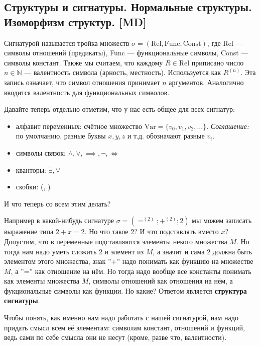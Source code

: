 \documentclass[a4paper, fleqn]{article}
\begin{document}
    \subsection{Структуры и сигнатуры. Нормальные структуры. Изоморфизм структур. [MD]}
    \begin{definition}
        Сигнатурой называется тройка множеств $\sigma = (\text{Rel}, \text{Func}, \text{Const})$,
        где Rel --- символы отношений (предикаты), Func --- функциональные символы,
        Const --- символы констант. Также мы считаем, что каждому $R \in \text{Rel}$
        приписано число $n \in \mathbb{N}$ --- валентность символа (арность, местность).
        Используется как $R^{(n)}$. Эта запись означает, что символ отношения
        принимает $n$ аргументов. Аналогично вводится валентность для функциональных символов.
    \end{definition}

    Давайте теперь отдельно отметим, что у нас есть общее для всех сигнатур:
    \begin{itemize}
        \item алфавит переменных: счётное множество $\text{Var} = \{v_0, v_1, v_2, \dots\}$.
        \textit{Соглашение:} по умолчанию, разные буквы $x, y, z$ и т.д. 
        обозначают разные $v_i$.
        \item символы связок: $\land, \lor, \implies, \neg, \iff$
        \item кванторы: $\exists, \forall$
        \item скобки: (, )
    \end{itemize}

    И что теперь со всем этим делать?

    Например в какой-нибудь сигнатуре $\sigma = (=^{(2)}; +^{(2)}; 2)$ мы можем записать выражение типа
    $2 + x = 2$. Но что такое 2? И что подставлять вместо $x$? Допустим, что в переменные подставляются
    элементы некого множества $M$. Но тогда нам надо уметь сложить 2 и элемент из $M$, а значит и сама
    2 должна быть элементом этого множества, знак ''+'' надо понимать как функцию на множестве $M$, а 
    ''='' как отношение на нём. Но тогда надо вообще все константы понимать как элементы множества $M$,
    символы отношений как отношения на нём, а фукциональные символы как функции. Но какие? Ответом является
    \textbf{структура сигнатуры}.

    Чтобы понять, как именно нам надо работать с нашей сигнатурой, нам надо придать смысл всем её элементам:
    символам констант, отношений и функций, ведь сами по себе смысла они не несут (кроме, разве что, валентности).
\end{document}
